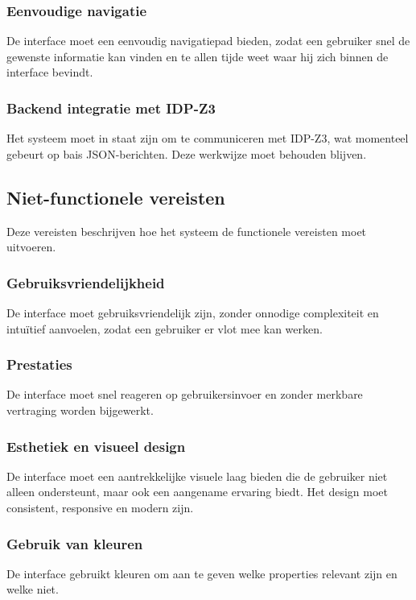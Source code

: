 \subsubsection{Eenvoudige navigatie}
De interface moet een eenvoudig navigatiepad bieden, zodat een gebruiker snel de gewenste informatie kan vinden en te allen tijde weet waar hij zich binnen de interface bevindt.

\subsubsection{Backend integratie met IDP-Z3}
Het systeem moet in staat zijn om te communiceren met IDP-Z3, wat momenteel gebeurt op bais JSON-berichten. Deze werkwijze moet behouden blijven. 

\subsection{Niet-functionele vereisten}
Deze vereisten beschrijven hoe het systeem de functionele vereisten moet uitvoeren. 

\subsubsection{Gebruiksvriendelijkheid}
De interface moet gebruiksvriendelijk zijn, zonder onnodige complexiteit en intuïtief aanvoelen, zodat een gebruiker er vlot mee kan werken.

\subsubsection{Prestaties}
De interface moet snel reageren op gebruikersinvoer en zonder merkbare vertraging worden bijgewerkt.

\subsubsection{Esthetiek en visueel design}
De interface moet een aantrekkelijke visuele laag bieden die de gebruiker niet alleen ondersteunt, maar ook een aangename ervaring biedt. Het design moet consistent, responsive en modern zijn.

\subsubsection{Gebruik van kleuren}
De interface gebruikt kleuren om aan te geven welke properties relevant zijn en welke niet.

